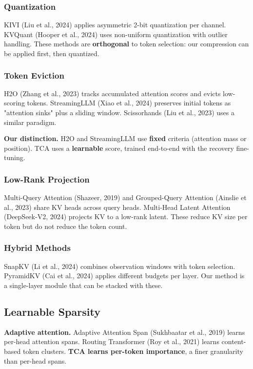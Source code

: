\subsubsection{Quantization}

KIVI (Liu et al., 2024) applies asymmetric 2-bit quantization per channel. 
KVQuant (Hooper et al., 2024) uses non-uniform quantization with outlier 
handling. These methods are \textbf{orthogonal} to token selection: our 
compression can be applied first, then quantized.

\subsubsection{Token Eviction}

H2O (Zhang et al., 2023) tracks accumulated attention scores and evicts 
low-scoring tokens. StreamingLLM (Xiao et al., 2024) preserves initial 
tokens as "attention sinks" plus a sliding window. Scissorhands (Liu et al., 
2023) uses a similar paradigm.

\textbf{Our distinction.} H2O and StreamingLLM use \textbf{fixed} criteria (attention 
mass or position). TCA uses a \textbf{learnable} score, trained end-to-end with 
the recovery fine-tuning.

\subsubsection{Low-Rank Projection}

Multi-Query Attention (Shazeer, 2019) and Grouped-Query Attention (Ainslie 
et al., 2023) share KV heads across query heads. Multi-Head Latent Attention 
(DeepSeek-V2, 2024) projects KV to a low-rank latent. These reduce KV size 
per token but do not reduce the token count.

\subsubsection{Hybrid Methods}

SnapKV (Li et al., 2024) combines observation windows with token selection. 
PyramidKV (Cai et al., 2024) applies different budgets per layer. Our method 
is a single-layer module that can be stacked with these.

\subsection{Learnable Sparsity}

\textbf{Adaptive attention.} Adaptive Attention Span (Sukhbaatar et al., 2019) 
learns per-head attention spans. Routing Transformer (Roy et al., 2021) 
learns content-based token clusters. \textbf{TCA learns per-token importance}, 
a finer granularity than per-head spans.

